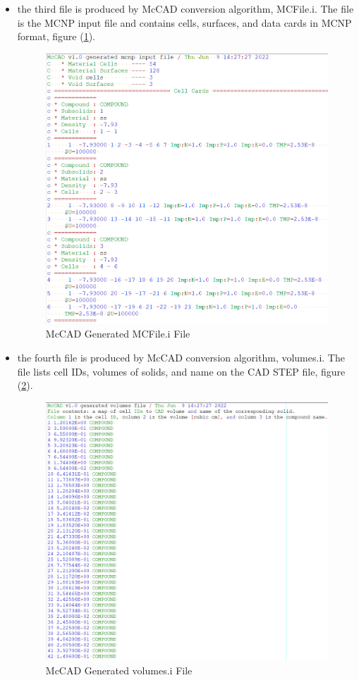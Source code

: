 \documentclass[12pt, a4paper, titlepage]{article}
\begin{document}
\begin{enumerate}
\begin{itemize}
	\item the third file is produced by McCAD conversion algorithm, MCFile.i. The file is the MCNP input file and contains cells, surfaces, and data cards in MCNP format, figure (\ref{fig:MCFile}).
	\begin{figure}[h!]
		\centering
		\includegraphics[scale=0.5]{figures/cellCards.png}
		\caption{McCAD Generated MCFile.i File}
		\label{fig:MCFile}
	\end{figure}

	\item the fourth file is produced by McCAD conversion algorithm, volumes.i. The file lists cell IDs, volumes of solids, and name on the CAD STEP file, figure (\ref{fig:volumes file}).
	\begin{figure}[h!]
		\centering
		\includegraphics[scale=0.5]{figures/volumesFile.png}
		\caption{McCAD Generated volumes.i File}
		\label{fig:volumes file}
	\end{figure}


\end{itemize}
\end{enumerate}
\end{document}
